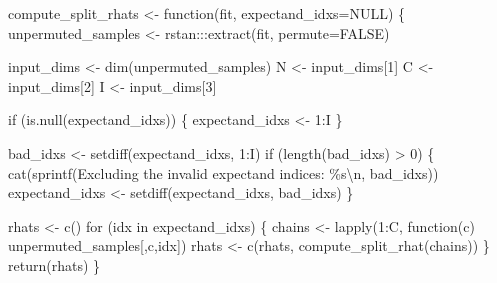 \documentclass[
  letterpaper,
  DIV=11,
  numbers=noendperiod]{scrartcl}
\newenvironment{Shaded}{\begin{snugshade}}{\end{snugshade}}
\newcommand{\AttributeTok}[1]{\textcolor[rgb]{0.40,0.45,0.13}{#1}}
\newcommand{\ConstantTok}[1]{\textcolor[rgb]{0.56,0.35,0.01}{#1}}
\newcommand{\ControlFlowTok}[1]{\textcolor[rgb]{0.00,0.23,0.31}{#1}}
\newcommand{\DecValTok}[1]{\textcolor[rgb]{0.68,0.00,0.00}{#1}}
\newcommand{\FunctionTok}[1]{\textcolor[rgb]{0.28,0.35,0.67}{#1}}
\newcommand{\NormalTok}[1]{\textcolor[rgb]{0.00,0.23,0.31}{#1}}
\newcommand{\OtherTok}[1]{\textcolor[rgb]{0.00,0.23,0.31}{#1}}
\newcommand{\SpecialCharTok}[1]{\textcolor[rgb]{0.37,0.37,0.37}{#1}}
\newcommand{\StringTok}[1]{\textcolor[rgb]{0.13,0.47,0.30}{#1}}
\begin{document}
\begin{Shaded}
\begin{Highlighting}[]
\NormalTok{compute\_split\_rhats }\OtherTok{\textless{}{-}} \ControlFlowTok{function}\NormalTok{(fit, }\AttributeTok{expectand\_idxs=}\ConstantTok{NULL}\NormalTok{) \{}
\NormalTok{  unpermuted\_samples }\OtherTok{\textless{}{-}}\NormalTok{ rstan}\SpecialCharTok{:::}\FunctionTok{extract}\NormalTok{(fit, }\AttributeTok{permute=}\ConstantTok{FALSE}\NormalTok{)}

\NormalTok{  input\_dims }\OtherTok{\textless{}{-}} \FunctionTok{dim}\NormalTok{(unpermuted\_samples)}
\NormalTok{  N }\OtherTok{\textless{}{-}}\NormalTok{ input\_dims[}\DecValTok{1}\NormalTok{]}
\NormalTok{  C }\OtherTok{\textless{}{-}}\NormalTok{ input\_dims[}\DecValTok{2}\NormalTok{]}
\NormalTok{  I }\OtherTok{\textless{}{-}}\NormalTok{ input\_dims[}\DecValTok{3}\NormalTok{]}

  \ControlFlowTok{if}\NormalTok{ (}\FunctionTok{is.null}\NormalTok{(expectand\_idxs)) \{}
\NormalTok{    expectand\_idxs }\OtherTok{\textless{}{-}} \DecValTok{1}\SpecialCharTok{:}\NormalTok{I}
\NormalTok{  \}}

\NormalTok{  bad\_idxs }\OtherTok{\textless{}{-}} \FunctionTok{setdiff}\NormalTok{(expectand\_idxs, }\DecValTok{1}\SpecialCharTok{:}\NormalTok{I)}
  \ControlFlowTok{if}\NormalTok{ (}\FunctionTok{length}\NormalTok{(bad\_idxs) }\SpecialCharTok{\textgreater{}} \DecValTok{0}\NormalTok{) \{}
    \FunctionTok{cat}\NormalTok{(}\FunctionTok{sprintf}\NormalTok{(}\StringTok{\textquotesingle{}Excluding the invalid expectand indices: \%s}\SpecialCharTok{\textbackslash{}n}\StringTok{\textquotesingle{}}\NormalTok{,}
\NormalTok{                bad\_idxs))}
\NormalTok{    expectand\_idxs }\OtherTok{\textless{}{-}} \FunctionTok{setdiff}\NormalTok{(expectand\_idxs, bad\_idxs)}
\NormalTok{  \}}

\NormalTok{  rhats }\OtherTok{\textless{}{-}} \FunctionTok{c}\NormalTok{()}
  \ControlFlowTok{for}\NormalTok{ (idx }\ControlFlowTok{in}\NormalTok{ expectand\_idxs) \{}
\NormalTok{    chains }\OtherTok{\textless{}{-}} \FunctionTok{lapply}\NormalTok{(}\DecValTok{1}\SpecialCharTok{:}\NormalTok{C, }\ControlFlowTok{function}\NormalTok{(c) unpermuted\_samples[,c,idx])}
\NormalTok{    rhats }\OtherTok{\textless{}{-}} \FunctionTok{c}\NormalTok{(rhats, }\FunctionTok{compute\_split\_rhat}\NormalTok{(chains))}
\NormalTok{  \}}
  \FunctionTok{return}\NormalTok{(rhats)}
\NormalTok{\}}
\end{Highlighting}
\end{Shaded}
\end{document}
